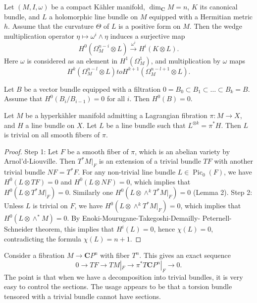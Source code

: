 \begin{theorem}[ETMDPS]
\label{theorem-etmdps-vanishing}
Let \((M,I,\omega)\) be a compact K\"ahler
manifold, \(\dim_{\mathbf{C}} M = n\), \(K\)
its canonical bundle, and \(L\) a
holomorphic line bundle on \(M\) equipped
with a Hermitian metric \(h\). Assume that
the curvature \(\Theta\) of \(L\) is a
positive form on \(M\). Then the wedge
multiplication operator \(\eta \mapsto
\omega^i \wedge \eta\) induces a surjective
map
\[
H^0(\Omega^{n-i}_M \otimes L)
\xrightarrow{\ \omega^i\ }
H^i(K \otimes L).
\]
Here \(\omega\) is considered as an element
in \(H^1(\Omega^1_M)\), and multiplication by
\(\omega\) maps
\[
H^k(\Omega^{n-l}_M \otimes L)
to H^{k+1}(\Omega^{n-l+1}_M \otimes L).
\]
\end{theorem}

\begin{lemma}
\label{lemma-global-sections-vanish}
Let \(B\) be a vector bundle equipped with a
filtration \(0 = B_0 \subset B_1 \subset
\ldots \subset B_k = B\). Assume that
\(H^0(B_i/B_{i-1}) = 0\) for all \(i\).
Then \(H^0(B)=0\).
\end{lemma}

\begin{theorem}
\label{theorem-line-bundle-trivial-on-fibers}
Let \(M\) be a hyperk\"ahler manifold
admitting a Lagrangian fibration
\(\pi : M \to X\), and \(H\) a line bundle on
\(X\). Let \(L\) be a line bundle such that
\(L^{\otimes k} = \pi^*H\). Then \(L\) is
trivial on all smooth fibers of \(\pi\).
\end{theorem}

\begin{proof}
Step 1: Let \(F\) be a smooth fiber of
\(\pi\), which is an abelian variety by
Arnol'd-Liouville. Then \(T^*M|_F\) is an
extension of a trivial bundle \(TF\) with
another trivial bundle \(NF = T^*F\). For
any non-trivial line bundle
\(L \in \operatorname{Pic}_0(F)\), we have
\(H^0(L\otimes TF)=0\) and
\(H^0(L\otimes NF)=0\), which implies that
\(H^0(L\otimes T^*M|_F)=0\). Similarly one
\(H^0(L\otimes \wedge^k T^*M|_F)=0\)
(Lemma 2).
Step 2: Unless \(L\) is trivial on \(F\), we
have \(H^0(L\otimes \wedge^k T^*M|_F)=0\),
which implies that \(H^0(L\otimes \wedge^*M)
=0\). By Enoki-Mourugane-Takegoshi-Demailly-
Peternell-Schneider theorem, this implies
that \(H^i(L)=0\), hence \(\chi(L)=0\),
contradicting the formula \(\chi(L)=n+1\).
\end{proof}

Consider a fibration \(M \to \mathbf{C}P^n\)
with fiber \(T^n\). This gives an exact
sequence
\[
0 \to TF \to TM|_F \to \pi^*T\mathbf{C}P^n|_F
\to 0.
\]
The point is that when we have a
decomposition into trivial bundles, it is
very easy to control the sections.
The usage appears to be that a torsion
bundle tensored with a trivial bundle cannot
have sections.

